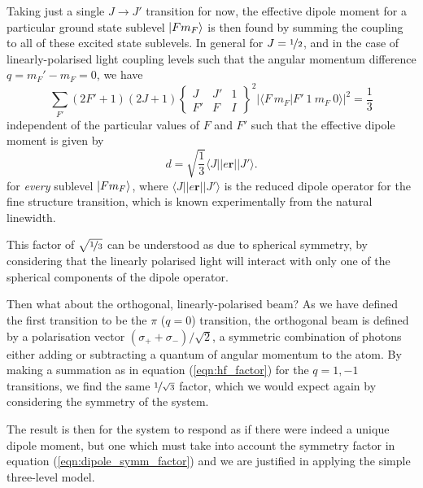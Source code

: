     Taking just a single $J \rightarrow J'$ transition for now, the effective
    dipole moment for a particular ground state sublevel $\Ket{F m_F}$ is then
    found by summing the coupling to all of these excited state sublevels. In
    general for $J = \nicefrac{1}{2}$\cite{test1}, and in the case of 
    linearly-polarised light coupling levels such that the angular momentum
    difference $q
    = m_F' - m_F = 0$, we have\cite{Steck2001}
    \begin{equation}\label{eqn:hf_factor}
      \sum_{F'} (2 F' + 1)(2 J + 1) 
        \begin{Bmatrix}
          J & J' & 1 \\[8pt]
          F' & F & I
        \end{Bmatrix}^2
        \lvert \langle F~m_F \vert F'~1~m_F~0 \rangle \rvert^2 = \frac{1}{3}
    \end{equation}
    independent of the particular values of $F$ and $F'$ such that the effective dipole moment is given by
    \begin{equation}\label{eqn:dipole_symm_factor}
      d = 
        \sqrt{\frac{1}{3}} \langle J || e \mathbf{r} || J' \rangle.
    \end{equation}
    for \textit{every} sublevel $\Ket{F m_F}$, where $\langle J || e \mathbf{r}
    || J' \rangle$ is the reduced dipole operator for the fine structure
    transition, which is known experimentally from the natural linewidth.

    This factor of $\sqrt{\nicefrac{1}{3}}$ can be understood as due to
    spherical symmetry, by considering that the linearly polarised light will
    interact with only one of the spherical components of the dipole operator.

    Then what about the orthogonal, linearly-polarised beam? As we have defined
    the first transition to be the $\pi$ ($q = 0$) transition, the orthogonal
    beam is defined by a polarisation vector $\left( \sigma_+ + \sigma_- \right)
    / \sqrt{2}$, a symmetric combination of photons either adding or subtracting
    a quantum of angular momentum to the atom. By making a summation as in
    equation (\ref{eqn:hf_factor}) for the $q = 1, -1$ transitions, we find the
    same $\nicefrac{1}{\sqrt{3}}$ factor, which we would expect again by
    considering the symmetry of the system.

    The result is then for the system to respond as if there were indeed a
    unique dipole moment, but one which must take into account the symmetry
    factor in equation (\ref{eqn:dipole_symm_factor}) and we are justified in
    applying the simple three-level model.

